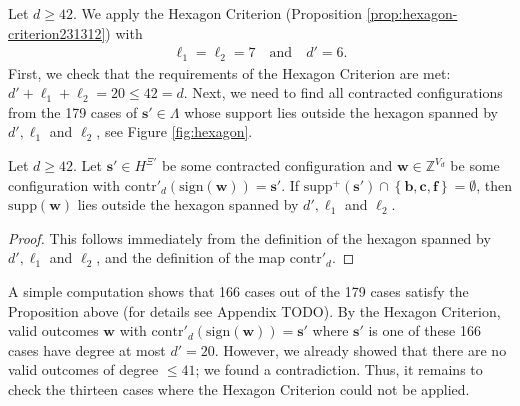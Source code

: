 Let \( d \geq 42 \). We apply the Hexagon Criterion (Proposition \ref{prop:hexagon-criterion231312}) with
\begin{align*}
    \ell_1 = \ell_2 = 7 \quad \text{and} \quad d' = 6.
\end{align*}
First, we check that the requirements of the Hexagon Criterion are met: \( d' + \ell_1 + \ell_2  = 20 \leq 42 = d \). Next, we need to find all contracted configurations from the 179 cases of \( \mathbf{s}' \in \Lambda \) whose support lies outside the hexagon spanned by \( d', \ell_1 \) and \( \ell_2 \), see Figure \ref{fig:hexagon}. 

\begin{proposition}
    Let \( d \geq 42 \).
    Let \( \mathbf{s}' \in H^{\Xi'} \) be some contracted configuration and \( \mathbf{w} \in \mathbb{Z}^{V_d} \) be some configuration with \( \mathrm{contr}'_d(\mathrm{sign}(\mathbf{w})) = \mathbf{s}' \). If \( \mathrm{supp}^+(\mathbf{s}') \cap \left\{ \mathbf{b}, \mathbf{c}, \mathbf{f} \right\} = \emptyset\), then \( \mathrm{supp}(\mathbf{w}) \) lies outside the hexagon spanned by \( d', \ell_1 \) and \( \ell_2 \).
\end{proposition}

\begin{proof}
    This follows immediately from the definition of the hexagon spanned by \( d', \ell_1 \) and \( \ell_2 \), and the definition of the map \( \mathrm{contr}'_d \).
\end{proof}

A simple computation shows that 166 cases out of the 179 cases satisfy the Proposition above (for details see Appendix TODO). By the Hexagon Criterion, valid outcomes \( \mathbf{w} \) with \( \mathrm{contr}'_d(\mathrm{sign}(\mathbf{w})) = \mathbf{s}' \) where \( \mathbf{s}' \) is one of these 166 cases have degree at most \( d' = 20 \). However, we already showed that there are no valid outcomes of degree \( \leq 41 \); we found a contradiction. Thus, it remains to check the thirteen cases where the Hexagon Criterion could not be applied.

